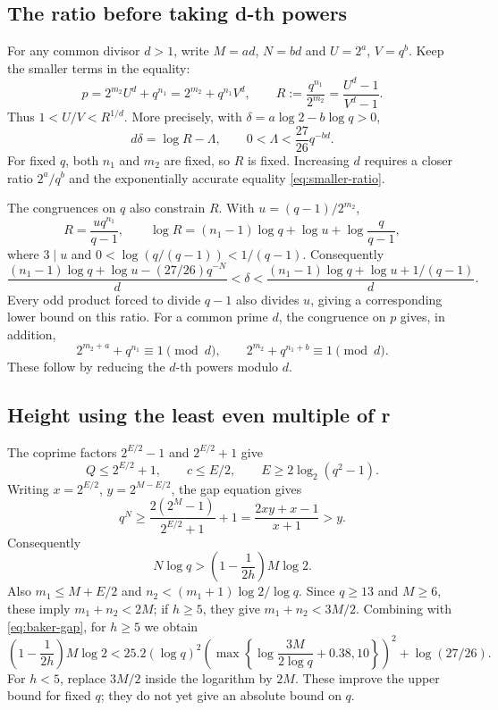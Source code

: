 \documentclass[11pt]{article}
\begin{document}
\subsection{The ratio before taking d-th powers}
For any common divisor $d>1$, write $M=ad$, $N=bd$ and
$U=2^a$, $V=q^b$. Keep the smaller terms in the equality:
\[
p=2^{m_2}U^d+q^{n_1}=2^{m_2}+q^{n_1}V^d,
\qquad
R:=\frac{q^{n_1}}{2^{m_2}}=\frac{U^d-1}{V^d-1}.
\]
Thus $1<U/V<R^{1/d}$. More precisely, with
$\delta=a\log2-b\log q>0$,
\begin{equation}\label{eq:smaller-ratio}
\boxed{d\delta=\log R-\Lambda,\qquad
0<\Lambda<\frac{27}{26}q^{-bd}.}
\end{equation}
For fixed $q$, both $n_1$ and $m_2$ are fixed, so $R$ is fixed.
Increasing $d$ requires a closer ratio $2^a/q^b$ and the
exponentially accurate equality \eqref{eq:smaller-ratio}.

The congruences on $q$ also constrain $R$. With
$u=(q-1)/2^{m_2}$,
\[
R=\frac{u q^{n_1}}{q-1},\qquad
\log R=(n_1-1)\log q+\log u+\log\frac q{q-1},
\]
where $3\mid u$ and $0<\log(q/(q-1))<1/(q-1)$.
Consequently
\[
\frac{(n_1-1)\log q+\log u-(27/26)q^{-N}}d
<\delta<
\frac{(n_1-1)\log q+\log u+1/(q-1)}d.
\]
Every odd product forced to divide $q-1$ also divides $u$, giving
a corresponding lower bound on this ratio. For a common prime $d$,
the congruence on $p$ gives, in addition,
\[
2^{m_2+a}+q^{n_1}\equiv1\pmod d,\qquad
2^{m_2}+q^{n_1+b}\equiv1\pmod d.
\]
These follow by reducing the $d$-th powers modulo $d$.

\subsection{Height using the least even multiple of r}
The coprime factors $2^{E/2}-1$ and $2^{E/2}+1$ give
\[
Q\le2^{E/2}+1,\qquad c\le E/2,\qquad
E\ge2\log_2(q^2-1).
\]
Writing $x=2^{E/2}$, $y=2^{M-E/2}$, the gap equation gives
\[
q^N\ge\frac{2(2^M-1)}{2^{E/2}+1}+1
=\frac{2xy+x-1}{x+1}>y.
\]
Consequently
\begin{equation}\label{eq:additional-height}
\boxed{N\log q>\left(1-\frac1{2h}\right)M\log2.}
\end{equation}
Also $m_1\le M+E/2$ and
$n_2<(m_1+1)\log2/\log q$. Since $q\ge13$ and $M\ge6$,
these imply $m_1+n_2<2M$; if $h\ge5$, they give
$m_1+n_2<3M/2$.
Combining with \eqref{eq:baker-gap}, for $h\ge5$ we obtain
\begin{equation}\label{eq:baker-additional}
\left(1-\frac1{2h}\right)M\log2
<25.2(\log q)^2
\left(\max\left\{\log\frac{3M}{2\log q}+0.38,10\right\}\right)^2
+\log(27/26).
\end{equation}
For $h<5$, replace $3M/2$ inside the logarithm by $2M$.
These improve the upper bound for fixed $q$; they do not yet give
an absolute bound on $q$.
\end{document}
